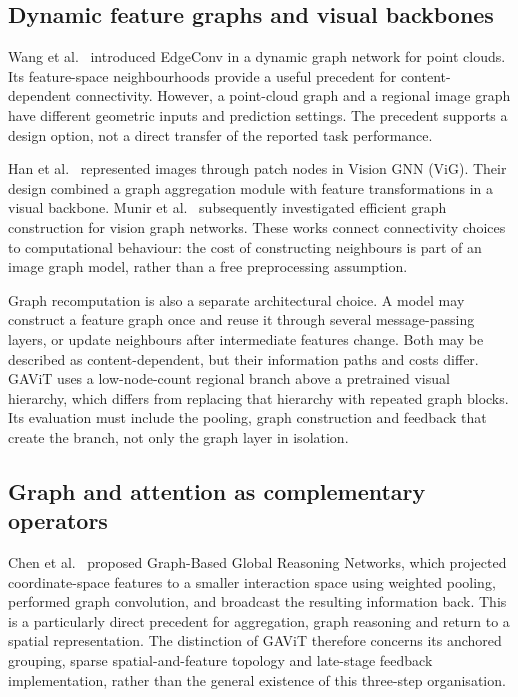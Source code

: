 \subsection{Dynamic feature graphs and visual backbones}

Wang et al.~\cite{wang2019dgcnn} introduced EdgeConv in a dynamic graph
network for point clouds. Its feature-space neighbourhoods provide a useful
precedent for content-dependent connectivity. However, a point-cloud graph
and a regional image graph have different geometric inputs and prediction
settings. The precedent supports a design option, not a direct transfer of
the reported task performance.

Han et al.~\cite{han2022vig} represented images through patch nodes in
Vision GNN (ViG). Their design combined a graph aggregation module with
feature transformations in a visual backbone. Munir
et al.~\cite{munir2024greedyvig} subsequently investigated efficient graph
construction for vision graph networks. These works connect connectivity
choices to computational behaviour: the cost of constructing neighbours is
part of an image graph model, rather than a free preprocessing assumption.

Graph recomputation is also a separate architectural choice. A model may
construct a feature graph once and reuse it through several message-passing
layers, or update neighbours after intermediate features change. Both may
be described as content-dependent, but their information paths and costs
differ. GAViT uses a low-node-count regional branch above a pretrained visual
hierarchy, which differs from replacing that hierarchy with repeated graph
blocks. Its evaluation must include the pooling, graph construction and
feedback that create the branch, not only the graph layer in isolation.

\subsection{Graph and attention as complementary operators}

Chen et al.~\cite{chen2019glore} proposed Graph-Based Global Reasoning
Networks, which projected coordinate-space features to a smaller interaction
space using weighted pooling, performed graph convolution, and broadcast
the resulting information back. This is a particularly direct precedent
for aggregation, graph reasoning and return to a spatial representation.
The distinction of GAViT therefore concerns its anchored grouping, sparse
spatial-and-feature topology and late-stage feedback implementation, rather
than the general existence of this three-step organisation.

